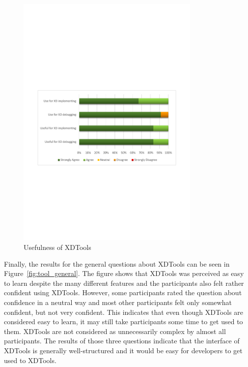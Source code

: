 \begin{figure}[H]
  \centering
    \includegraphics[width=0.8\textwidth]{images/charts/usefulness_tool.pdf}
	\caption[Usefulness]{Usefulness of XDTools}
	\label{fig:usefulness_tool}
\end{figure}

Finally, the results for the general questions about XDTools can be seen in Figure~\ref{fig:tool_general}. The figure shows that XDTools was perceived as easy to learn despite the many different features and the participants also felt rather confident using XDTools. However, some participants rated the question about confidence in a neutral way and most other participants felt only somewhat confident, but not very confident. This indicates that even though XDTools are considered easy to learn, it may still take participants some time to get used to them. XDTools are not considered as unnecessarily complex by almost all participants. The results of those three questions indicate that the interface of XDTools is generally well-structured and it would be easy for developers to get used to XDTools.

